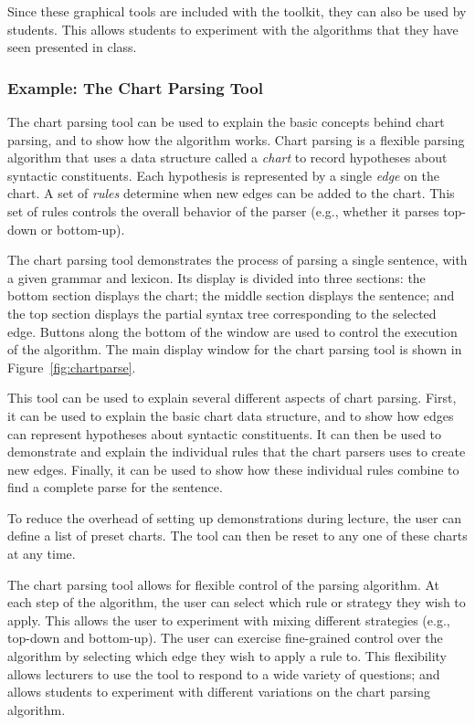 \documentclass[11pt]{article}
\begin{document}
Since these graphical tools are included with the toolkit, they can
also be used by students.  This allows students to experiment with the
algorithms that they have seen presented in class.

\subsubsection*{Example: The Chart Parsing Tool}

The chart parsing tool can be used to explain the basic concepts
behind chart parsing, and to show how the algorithm works.  Chart
parsing is a flexible parsing algorithm that uses a data structure
called a \emph{chart} to record hypotheses about syntactic
constituents.  Each hypothesis is represented by a single \emph{edge}
on the chart.  A set of \emph{rules} determine when new edges can be
added to the chart.  This set of rules controls the overall behavior
of the parser (e.g., whether it parses top-down or bottom-up).

The chart parsing tool demonstrates the process of parsing a single
sentence, with a given grammar and lexicon.  Its display is divided
into three sections: the bottom section displays the chart; the middle
section displays the sentence; and the top section displays the
partial syntax tree corresponding to the selected edge.  Buttons along
the bottom of the window are used to control the execution of the
algorithm.  The main display window for the chart parsing tool is
shown in Figure~\ref{fig:chartparse}.   

This tool can be used to explain several different aspects of chart
parsing.  First, it can be used to explain the basic chart data
structure, and to show how edges can represent hypotheses about
syntactic constituents.  It can then be used to demonstrate and
explain the individual rules that the chart parsers uses to create new
edges.  Finally, it can be used to show how these individual rules
combine to find a complete parse for the sentence.

To reduce the overhead of setting up demonstrations during lecture,
the user can define a list of preset charts.  The tool can then be
reset to any one of these charts at any time.

The chart parsing tool allows for flexible control of the parsing
algorithm.  At each step of the algorithm, the user can select which
rule or strategy they wish to apply.  This allows the user to
experiment with mixing different strategies (e.g., top-down and
bottom-up).  The user can exercise fine-grained control over the
algorithm by selecting which edge they wish to apply a rule to.  This
flexibility allows lecturers to use the tool to respond to a wide
variety of questions; and allows students to experiment with different
variations on the chart parsing algorithm.
\end{document}
